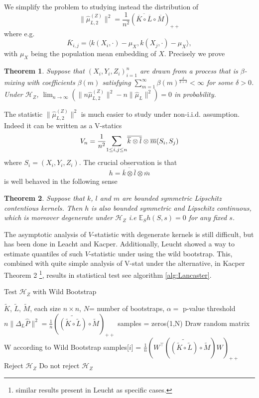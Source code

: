 \documentclass[]{article}
\newtheorem{theorem}{Theorem}
\begin{document}
We simplify the problem to studying instead the distribution of
\[
\| \hat \mu^{(Z)}_{L,2} \|^2 =\frac{1}{n^2}\left(\overline{\overline{K}\circ\overline{L}}\circ\overline{M}\right)_{++}
\]
where e.g. 
\[
\overline{K}_{i,j} = \langle k(X_i,\cdot)-\mu_X, k(X_j,\cdot) -\mu_X \rangle,
\]
with $\mu_X$ being the population mean embedding of $X$. Precisely we prove
\begin{theorem}\label{theorem:norm-conv-in-prob} Suppose that $(X_i,Y_i,Z_i)_{i=1}^n$ are drawn from a process that is $\beta$-mixing with coefficients $\beta(m)$ satisfying $\sum_{m=1}^{\infty}\beta(m)^{\frac{\delta}{2+\delta}}<\infty$ for some $\delta>0$. Under $\mathcal{H}_Z$, $\lim_{n \to \infty} ( \| n\hat \mu^{(Z)}_{L,2} \|^2 - n\|\hat \mu_L\|^2 ) =0 $ in probability.
\end{theorem}
The statistic $\| \hat \mu^{(Z)}_{L,2} \|^2$ is much easier to study under non-i.i.d.  assumption. Indeed it can be written as a V-statics 
\[ 
V_n = \frac{1}{n^2} \mathlarger{\sum}_{1\leq i,j \leq n} \overline{\overline{k} \otimes \overline{l}}\otimes \overline{m} (S_i,S_j)
\]
where  $S_i = (X_i,Y_i,Z_i)$. The crucial observation is that
\[
 h = \overline{\overline{k} \otimes \overline{l}}\otimes \overline{m}
\]
is well behaved in the following sense 
\begin{theorem}\label{theorem:degenerate-kernel}
Suppose that $k$, $l$ and $m$ are bounded symmetric Lipschitz contentious kernels. Then $h$ is also bounded symmetric and Lipschitz continuous, which is moreover degenerate under $\mathcal{H}_Z$ i.e $\mathbb{E}_{S}h(S,s)=0$ for any fixed $s$.
\end{theorem}
The asymptotic analysis of $V$-statistic with degenerate kernels is still difficult, but has been done in Leacht and Kacper. Additionally, Leucht showed a way to estimate quantiles of such $V$-statistic under using the  wild bootstrap. This, combined with quite simple analysis of V-stat under the alternative, in Kacper Theorem 2 \footnote{similar results present in Leucht as specific cases.}, results in statistical test see algorithm \ref{alg:Lancaster}.
\begin{algorithm}[tb]
   \caption{Test $\mathcal{H}_Z$ with Wild Bootstrap}
   \label{alg:Lancaster}
\begin{algorithmic}
    $\tilde{K}$, $\tilde{L}$, $\tilde{M}$, each size $n\times n$, $N$= number of bootstraps, $\alpha=$ p-value threshold
   \STATE $n\|\Delta_L\hat{P}\|^2 = \frac{1}{n}\left(\widetilde{\left( \tilde{K} \circ \tilde{L}\right) }\circ \tilde{M} \right)_{++}$
   \STATE samples = zeros(1,N)
   \STATE Draw random matrix W according to Wild Bootstrap
   \STATE samples[$i$] = $\frac{1}{n}\left(W^\intercal\left( \widetilde{\left( \tilde{K} \circ \tilde{L}\right) }\circ \tilde{M} \right)W\right) _{++}$
   \ENDFOR
   \STATE Reject $\mathcal{H}_Z$
   \ELSE
   \STATE Do not reject $\mathcal{H}_Z$
   \ENDIF
\end{algorithmic}
\end{algorithm}
\end{document}
